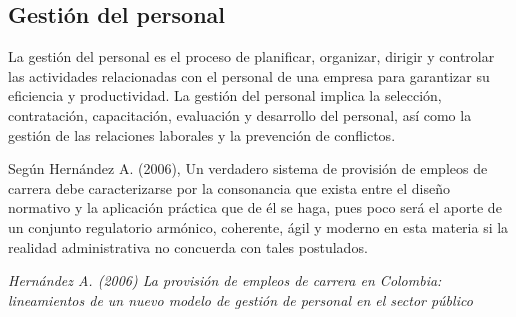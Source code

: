 \documentclass{article}
\newenvironment{marcoTeorico}{}{}
\begin{document}
\begin{marcoTeorico}
  \subsection{Gestión del personal}

    La gestión del personal es el proceso de planificar, organizar, dirigir y controlar las actividades relacionadas con el personal de una empresa para garantizar su eficiencia y productividad. La gestión del personal implica la selección, contratación, capacitación, evaluación y desarrollo del personal, así como la gestión de las relaciones laborales y la prevención de conflictos.

    Según Hernández A. (2006), Un verdadero sistema de provisión de empleos de carrera debe caracterizarse por la consonancia que exista entre el diseño normativo y la aplicación práctica que de él se haga, pues poco será el aporte de 
    un conjunto regulatorio armónico, coherente, ágil y moderno en esta materia si la realidad 
    administrativa no concuerda con tales postulados.

    \begin{flushright}
      \textit{Hernández A. (2006) La provisión de empleos de carrera en Colombia: lineamientos de un nuevo modelo de gestión de personal en el sector público}
    \end{flushright}

\end{marcoTeorico}

\newpage
\end{document}
